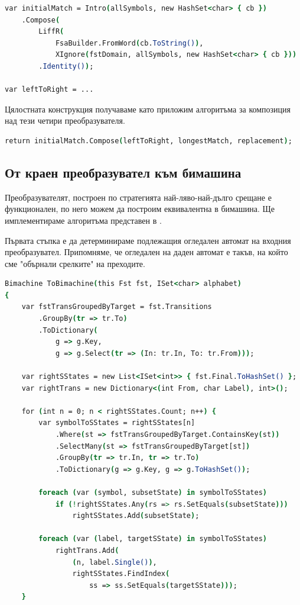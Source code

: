 \documentclass[12pt, oneside]{article}
\theoremstyle{definition}
\begin{document}
\begin{lstlisting}[language=csh,firstnumber=1]
var initialMatch = Intro(allSymbols, new HashSet<char> { cb })
    .Compose(
        LiffR(
            FsaBuilder.FromWord(cb.ToString()),
            XIgnore(fstDomain, allSymbols, new HashSet<char> { cb }))
		.Identity());

var leftToRight = ...
\end{lstlisting}

Цялостната конструкция получаваме като приложим алгоритъма за композиция над тези четири преобразувателя.

\begin{lstlisting}[language=csh,firstnumber=1]
	return initialMatch.Compose(leftToRight, longestMatch, replacement);
\end{lstlisting}

\subsection{От краен преобразувател към бимашина}

Преобразувателят, построен по стратегията най-ляво-най-дълго срещане е функционален, по него можем да построим еквивалентна в бимашина. Ще имплементираме алгоритъма представен в \cite{GerdjikovEtAl:2017}.

Първата стъпка е да детерминираме подлежащия огледален автомат на входния преобразувател. Припомняме, че огледален на даден автомат е такъв, на който сме "обърнали срелките" на преходите.

\begin{lstlisting}[language=csh,firstnumber=1]
Bimachine ToBimachine(this Fst fst, ISet<char> alphabet)
{
    var fstTransGroupedByTarget = fst.Transitions
        .GroupBy(tr => tr.To)
        .ToDictionary(
            g => g.Key, 
            g => g.Select(tr => (In: tr.In, To: tr.From)));

    var rightSStates = new List<ISet<int>> { fst.Final.ToHashSet() };
    var rightTrans = new Dictionary<(int From, char Label), int>();

    for (int n = 0; n < rightSStates.Count; n++) {
        var symbolToSStates = rightSStates[n]
            .Where(st => fstTransGroupedByTarget.ContainsKey(st))
            .SelectMany(st => fstTransGroupedByTarget[st])
            .GroupBy(tr => tr.In, tr => tr.To)
            .ToDictionary(g => g.Key, g => g.ToHashSet());

        foreach (var (symbol, subsetState) in symbolToSStates)
            if (!rightSStates.Any(rs => rs.SetEquals(subsetState)))
                rightSStates.Add(subsetState);
        
        foreach (var (label, targetSState) in symbolToSStates)
            rightTrans.Add(
                (n, label.Single()),
                rightSStates.FindIndex(
                    ss => ss.SetEquals(targetSState)));
	}
\end{lstlisting}
\end{document}
